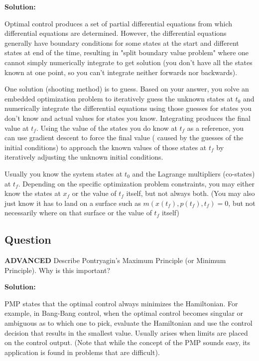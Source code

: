 \documentclass{article}
\newenvironment{Solution}{
\begin{tcolorbox}
\color{purple}
\textbf{Solution:}
}
{
\end{tcolorbox}
\ignorespacesafterend
}
\newcommand{\RatingBase}[2]{\textcolor{#1}{{\fontfamily{phv}\selectfont\textbf{#2}}}}
\newcommand{\Advanced}{\RatingBase{red!50!black!50}{ADVANCED}}
\begin{document}
\begin{Solution}
Optimal control produces a set of partial differential equations from which differential equations are determined.  However, the differential equations generally have boundary conditions for some states at the start and different states at end of the time, resulting in "split boundary value problem" where one cannot simply numerically integrate to get solution (you don't have all the states known at one point, so you can't integrate neither forwards nor backwards).  

One solution (shooting method) is to guess. Based on your answer, you solve an embedded optimization problem to  iteratively guess the unknown states at $t_0$ and numerically integrate the differential equations using those guesses for states you don't know and actual values for states you know.   Integrating produces the final value at $t_f$. Using the value of the states you do know at $t_f$ as a reference, you can use gradient descent to force the final value ( caused by the guesses of the initial conditions) to approach the known values of those states at $t_f$ by iteratively adjusting the unknown initial conditions. 

Usually you know the system states at $t_0$ and the Lagrange multipliers (co-states) at $t_f$.  Depending on the specific optimization problem constraints, you may either know the states at $x_f$ or the value of $t_f$ itself, but not always both.  (You may also just know it has to land on a surface such as $m(x(t_f), p(t_f), t_f) = 0$, but not necessarily where on that surface or the value of $t_f$ itself)
\end{Solution}



\subsection{Question} \Advanced{}
Describe Pontryagin's Maximum Principle (or Minimum Principle).  Why is this important?



\begin{Solution}
PMP states that the optimal control always minimizes the Hamiltonian.  For example, in Bang-Bang control, when the optimal control becomes singular or ambiguous as to which one to pick, evaluate the Hamiltonian and use the control decision that results in the smallest value.  Usually arises when limits are placed on the control output.  (Note that while the concept of the PMP sounds easy, its application is found in problems that are difficult).
\end{Solution}
\end{document}
